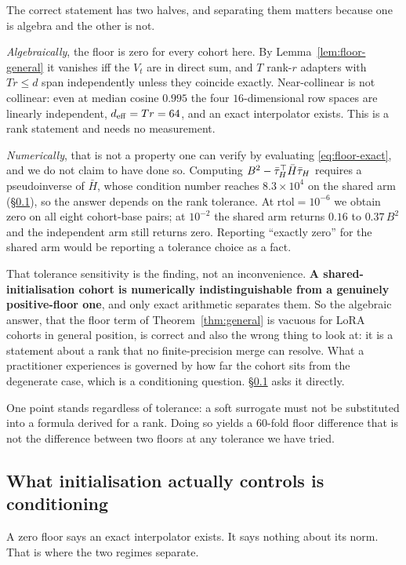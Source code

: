 The correct statement has two halves, and separating them matters because
one is algebra and the other is not.

\emph{Algebraically}, the floor is zero for every cohort here. By
Lemma~\ref{lem:floor-general} it vanishes iff the $V_t$ are in direct sum,
and $T$ rank-$r$ adapters with $Tr \leq d$ span independently unless they
coincide exactly. Near-collinear is not collinear: even at median cosine
$0.995$ the four $16$-dimensional row spaces are linearly independent,
$d_{\mathrm{eff}} = Tr = 64$, and an exact interpolator exists. This is a rank
statement and needs no measurement.

\emph{Numerically}, that is not a property one can verify by evaluating
\eqref{eq:floor-exact}, and we do not claim to have done so. Computing
$B^2 - \bar{\tau}_H^\top\bar H\bar{\tau}_H$ requires a pseudoinverse of $\bar H$, whose
condition number reaches $8.3\times10^{4}$ on the shared arm
(\S\ref{subsec:conditioning}), so the answer depends on the rank tolerance.
At $\mathrm{rtol} = 10^{-6}$ we obtain zero on all eight cohort-base pairs;
at $10^{-2}$ the shared arm returns $0.16$ to $0.37\,B^2$ and the
independent arm still returns zero. Reporting ``exactly zero'' for the shared
arm would be reporting a tolerance choice as a fact.

That tolerance sensitivity is the finding, not an inconvenience.
\textbf{A shared-initialisation cohort is numerically indistinguishable from
a genuinely positive-floor one}, and only exact arithmetic separates them.
So the algebraic answer, that the floor term of
Theorem~\ref{thm:general} is vacuous for LoRA cohorts in general position,
is correct and also the wrong thing to look at: it is a statement about a
rank that no finite-precision merge can resolve. What a practitioner
experiences is governed by how far the cohort sits from the degenerate case,
which is a conditioning question. \S\ref{subsec:conditioning} asks it
directly.

One point stands regardless of tolerance: a soft surrogate must not be
substituted into a formula derived for a rank. Doing so yields a $60$-fold
floor difference that is not the difference between two floors at any
tolerance we have tried.

\subsection{What initialisation actually controls is conditioning}
\label{subsec:conditioning}

A zero floor says an exact interpolator exists. It says nothing about its
norm. That is where the two regimes separate.

